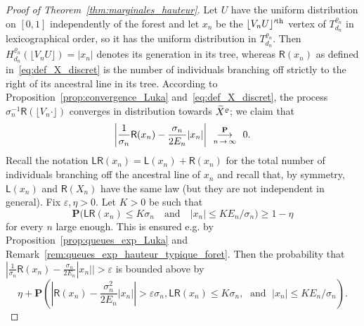 \documentclass[10pt]{amsart}
\theoremstyle{definition}\newtheorem{defi}[theo]{Definition}\newtheorem{rema}[theo]{Remark}\newtheorem{exam}[theo]{Example}\newtheorem{exem}[theo]{Example}\newtheorem{nota}[theo]{Notation}
\newcommand{\ensembles}[1]{\mathbf{#1}}
\renewcommand{\P}{\ensembles{P}}
\renewcommand{\Pr}[1]{\P\left(#1\right)}
\newcommand{\1}{\ensembles{1}}
\newcommand{\tildep}[1]{\widetilde{#1}\vphantom{#1}}
\renewcommand{\le}{\leqslant}
\renewcommand{\ge}{\geqslant}
\newcommand{\LL}{\mathsf{L}}
\newcommand{\RR}{\mathsf{R}}
\newcommand{\LR}{\mathsf{LR}}
\newcommand{\fn}{T_{d_n}^{\varrho_n}}
\newcommand{\Hfn}{H_{d_n}^{\varrho_n}}
\newcommand{\tX}{\tildep{X}^{\varrho}}
\newcommand{\edges}{E}
\newcommand{\vertices}{V}
\newcommand{\cvproba}[1][n]{\enskip\mathop{\longrightarrow}^{\P}_{#1\,\to\, \infty}\enskip}
\providecommand{\?}{}
\begin{document}
\begin{proof}[Proof of Theorem~\ref{thm:marginales_hauteur}]
Let $U$ have the uniform distribution on $[0,1]$ independently of the forest and let $x_n$ be the $\lfloor \vertices_n U\rfloor'^{\rm th}$ vertex of $\fn$ in lexicographical order, so it has the uniform distribution in $\fn$. Then $\Hfn(\lfloor \vertices_n U\rfloor) = |x_n|$ denotes its generation in its tree, whereas $\RR(x_n)$ as defined in~\eqref{eq:def_X_discret} is the number of individuals branching off strictly to the right of its ancestral line in its tree. According to Proposition~\ref{prop:convergence_Luka} and~\eqref{eq:def_X_discret}, the process $\sigma_n^{-1} \RR(\lfloor \vertices_n \cdot\rfloor)$ converges in distribution towards $\tX$; we claim that
\begin{equation}\label{eq:ecart_longueur_LR}
\left|\frac{1}{\sigma_n} \RR(x_n) - \frac{\sigma_n}{2 \edges_n} |x_n| \right| \cvproba 0.
\end{equation}
Recall the notation $\LR(x_n) = \LL(x_n) + \RR(x_n)$ for the total number of individuals branching off the ancestral line of $x_n$ and recall that, by symmetry, $\LL(x_n)$ and $\RR(X_n)$ have the same law (but they are not independent in general). Fix $\varepsilon, \eta > 0$. Let $K > 0$ be such that
\[
\P\big(\LR(x_n) \le K \sigma_n\quad \text{and}\quad |x_n| \le K \edges_n / \sigma_n\big) \ge 1-\eta
\]
for every $n$ large enough. This is ensured e.g. by Proposition~\ref{prop:queues_exp_Luka} and Remark~\ref{rem:queues_exp_hauteur_typique_foret}. Then the probability that $|\frac{1}{\sigma_n}\RR(x_n) - \frac{\sigma_n}{2 \edges_n}|x_n|| > \varepsilon$ is bounded above by
\[
\eta + \Pr{\left|\RR\left(x_n\right) - \frac{\sigma_n^2}{2 \edges_n}|x_n|\right| > \varepsilon \sigma_n,
\LR(x_n) \le K \sigma_n,
\;\text{ and }\; |x_n| \le K \edges_n / \sigma_n}.
\]



\end{proof}
\end{document}
